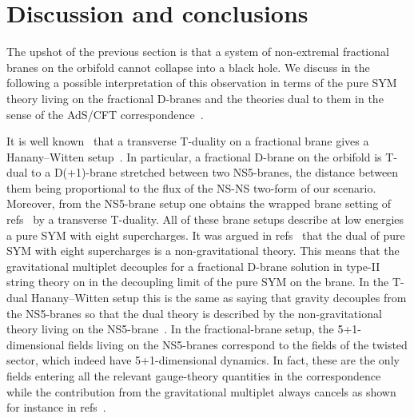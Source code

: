 \documentclass[a4paper,11pt]{article}
\providecommand{\ZZ}{\mathbb{Z}}  \providecommand{\Zint}{\mathbb{Z}}
\begin{document}
\vspace{1ex}
\section{Discussion and conclusions}
\label{disc}

The upshot of the previous section is that a system of non-extremal
fractional branes on the orbifold \myHighlight{$T^4\!/\ZZ_2$}\coordHE{} cannot collapse into a
black hole. We discuss in the following a possible interpretation of
this observation in terms of the pure SYM theory living on the fractional
D-branes and the theories dual to them in the sense of the AdS/CFT
correspondence~\cite{Maldacena:1997re,Gubser:1998bc,Witten:1998qj}.

It is well known~\cite{Karch:1998yv} that a transverse T-duality on a
fractional brane gives a Hanany--Witten setup~\cite{Hanany:1997ie}.
In particular, a fractional D\coordHE{}-brane on the orbifold \myHighlight{$T^4\!/\ZZ_2$}\coordHE{}
is  T-dual to a D(\coordHE{}+1)-brane stretched between two NS5-branes, the
distance  between them being proportional to the flux \coordHE{} of the NS-NS
two-form of  our scenario. Moreover, from the NS5-brane setup one
obtains the wrapped  brane setting of
refs~\cite{Johnson:1999qt,DiVecchia:2001uc} by a transverse
T-duality. All of these brane setups describe at low energies a pure
SYM  with eight supercharges. It was argued in
refs~\cite{Johnson:1999qt,Wijnholt:2001us} that the dual of pure SYM
with eight supercharges is a non-gravitational theory. This means that
the gravitational multiplet decouples for a fractional D-brane
solution in type-II string theory on \myHighlight{$T^4\!/\ZZ_2$}\coordHE{} in the decoupling
limit of the pure SYM on the brane. In the T-dual Hanany--Witten
setup this is the same as saying that gravity decouples from the
NS5-branes so that the dual theory is described by the
non-gravitational theory living on the
NS5-brane~\cite{Seiberg:1997zk,Dijkgraaf:1997ku,Aharony:1998ub}. In
the fractional-brane setup, the 5+1-dimensional fields living on the
NS5-branes correspond to the fields of the twisted sector, which
indeed have 5+1-dimensional dynamics. In fact, these are the only
fields entering all the relevant gauge-theory quantities in the
correspondence while the contribution from the gravitational
multiplet always cancels as shown for instance in
refs~\cite{Bertolini:2000dk,Grana:2001xn,Bertolini:2001qa,Billo:2001vg,
Klebanov:1999rd,Klebanov:2002gr,Bertolini:2002xu}.
\end{document}
